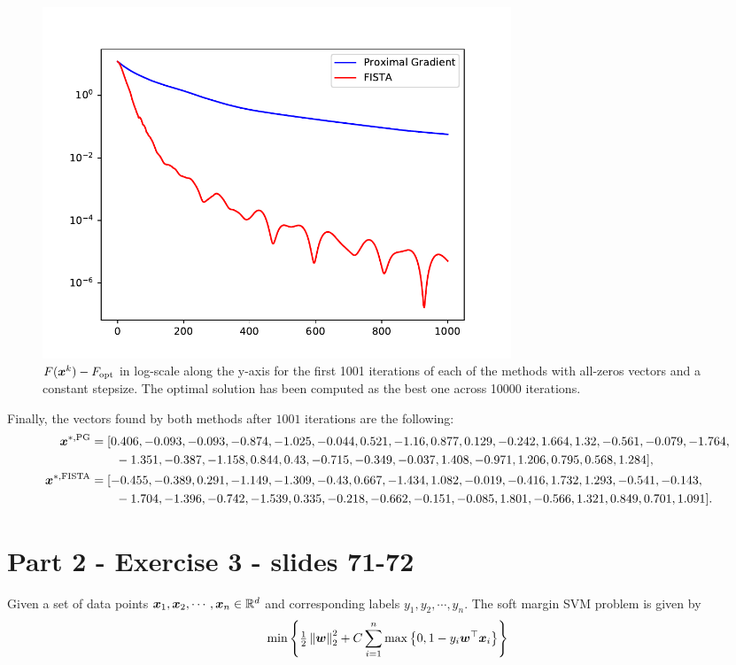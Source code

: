 \begin{figure}[H]
    \centering
    \includegraphics[width=14cm]{images/part2_ex1.pdf}
    \caption{$F(\boldsymbol x^k)-F_{\text{opt}}$ in log-scale along the 
  y-axis for the first 1001 iterations of each of the methods 
  with all-zeros vectors and a constant stepsize. The optimal solution has been computed as the best one across 10000 iterations.  }
  \label{fig:ex1}
\end{figure}
Finally, the vectors found by both methods after $1001$ iterations are the following:
       \begin{align*}
       \boldsymbol x^{*,\text{PG}} &= [0.406, -0.093, -0.093, -0.874, -1.025, -0.044,  0.521, -1.16 ,
        0.877,  0.129, -0.242,  1.664,  1.32 , -0.561, -0.079, -1.764,\\& \qquad 
       -1.351, -0.387, -1.158,  0.844,  0.43 , -0.715, -0.349, -0.037,
        1.408, -0.971,  1.206,  0.795,  0.568,  1.284],\\
        \boldsymbol x^{*,\text{FISTA}} &= [-0.455, -0.389,  0.291, -1.149, -1.309, -0.43 ,  0.667, -1.434,
        1.082, -0.019, -0.416,  1.732,  1.293, -0.541, -0.143,\\& \qquad  -1.704,
       -1.396, -0.742, -1.539,  0.335, -0.218, -0.662, -0.151, -0.085,
        1.801, -0.566,  1.321,  0.849,  0.701,  1.091].
       \end{align*}
        


%
\section{Part 2 - Exercise 3 - slides 71-72}
%
Given a set of data points $\boldsymbol x_1, \boldsymbol x_2,\cdots,\boldsymbol x_n \in \mathbb{R}^d$ and 
corresponding labels $y_1,y_2,\cdots,y_n$. The soft margin SVM problem is given 
by 
\begin{equation*}
    \min \left\{{\textstyle\frac{1}{2}}\left\lVert\boldsymbol w\right\rVert_{2}^2+C \sum_{i=1}^{n} \max 
    \left\{0,1-y_i \boldsymbol w^\top \boldsymbol x_i\right\}\right\}
\end{equation*}

